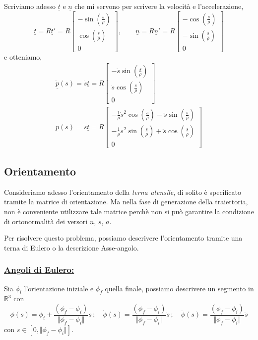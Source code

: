 Scriviamo adesso $\underline{t}$ e $\underline{n}$ che mi servono per scrivere la velocità e l'accelerazione,
\begin{equation}
	\underline{t} = R \underline{t}' = R
	\begin{bmatrix}
		- \sin(\frac{s}{\rho}) \\
		\cos(\frac{s}{\rho}) \\
		0
	\end{bmatrix},
	\qquad
	\underline{n} = R \underline{n}' = R
	\begin{bmatrix}
		- \cos(\frac{s}{\rho}) \\
		- \sin(\frac{s}{\rho}) \\
		0
	\end{bmatrix}
\end{equation}
e otteniamo,
\begin{align*}
	\dot{\underline{p}}(s) = \dot{s} \underline{t} = R 
	\begin{bmatrix}
		- \dot{s} \sin(\frac{s}{\rho}) \\
		\dot{s} \cos(\frac{s}{\rho}) \\
		0
	\end{bmatrix}
	\\
	\ddot{\underline{p}}(s) = \ddot{s} \underline{t} = R
	\begin{bmatrix}
		- \frac{1}{\rho} \dot{s}^2 \cos(\frac{s}{\rho}) - \ddot{s} \sin(\frac{s}{\rho}) \\
		- \frac{1}{\rho} \dot{s}^2 \sin(\frac{s}{\rho}) + \ddot{s} \cos(\frac{s}{\rho}) \\
		0
	\end{bmatrix}
\end{align*}
\newpage
\subsection{Orientamento}
Consideriamo adesso l'orientamento della \emph{terna utensile}, di solito è specificato tramite la matrice di orientazione. Ma nella fase di generazione della traiettoria, non è conveniente utilizzare tale matrice perchè non si può garantire la condizione di ortonormalità dei versori $\underline{n}$, $\underline{s}$, $\underline{a}$. 

Per risolvere questo problema, possiamo descrivere l'orientamento tramite una terna di Eulero o la descrizione Asse-angolo.

\subsubsection{\underline{Angoli di Eulero:}}
Sia $\phi_i$ l'orientazione iniziale e $\phi_f$ quella finale, possiamo descrivere un segmento in $\mathbb{R}^3$ con
\begin{equation*}
	\phi(s) = \phi_i + \frac{(\phi_f - \phi_i)}{\Vert \phi_f - \phi_i \Vert}s\, ; \quad
	\dot{\phi}(s) = \frac{(\phi_f - \phi_i)}{\Vert \phi_f - \phi_i \Vert} \dot{s} \, ; \quad
	\ddot{\phi}(s) = \frac{(\phi_f - \phi_i)}{\Vert \phi_f - \phi_i \Vert} \ddot{s}
\end{equation*}
con $s \in [0, \Vert \phi_f - \phi_i \Vert]$.

